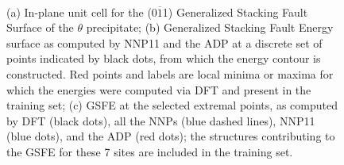 \documentclass{article}
\begin{document}
\begin{figure}[H]%
\centering%
%
%
\\
%
\caption{(a) In-plane unit cell for the (0$\overline{1}$1) Generalized Stacking Fault Surface of the $\theta$ precipitate; (b) Generalized Stacking Fault Energy surface as computed by NNP11 and the ADP at a discrete set of points indicated by black dots, from which the energy contour is constructed.  Red points and labels are local minima or maxima for which the energies were computed via DFT and present in the training set; (c) GSFE at the selected extremal points, as computed by DFT (black dots), all the NNPs (blue dashed lines), NNP11 (blue dots), and the ADP (red dots); the structures contributing to the GSFE for these 7 sites are included in the training set.}
\label{fig:GSF_Theta_0m11}
\end{figure}
\end{document}
